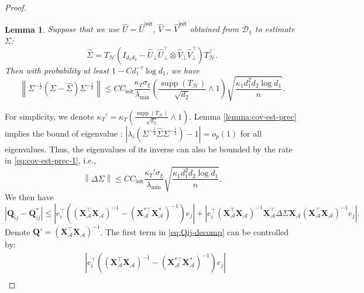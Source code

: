 \documentclass[12pt]{article}
\newcommand{\abs}[1]{\left\lvert#1\right\rvert}
\newcommand{\norm}[1]{\left\lVert#1\right\rVert}
\newcommand{\cD}{\mathcal{D}}
\def\calH{{\mathcal H}}
\newcommand{\init}{{\mathsf{init}}}
\newtheorem{Lemma}{Lemma}
\theoremstyle{plain}
\begin{document}
\begin{proof}
\begin{Lemma}
    Suppose that we use $\widehat{U}=\widehat{U}^{\init}$, $\widehat{V}=\widehat{V}^{\init}$ obtained from  $\cD_1$ to estimate $\Sigma$: 
    $$\widehat{\Sigma}= T_{\calH}(I_{d_1 d_2} - \widehat U_\perp \widehat U_\perp^\top \otimes \widehat V_\perp \widehat V_\perp^\top  ) T_{\calH}^\top. $$ 
    Then with probability at least $1-Cd_1^{-\tau}\log d_1 $, we have 
    \begin{equation}\label{eq:cov-est-prec-1}
        \norm{\Sigma^{-\frac{1}{2} }(\Sigma-\widehat{\Sigma})\Sigma^{-\frac{1}{2} } }\le CC_{\init}\frac{\kappa_T \sigma_\xi }{\lambda_{\min} }\left( \frac{\operatorname{supp}(T_{\calH} )}{\sqrt{d_2}}\wedge 1 \right)  \sqrt{\frac{ \kappa_1  d_1^2 d_2 \log d_1 }{n}}.
    \end{equation}
\end{Lemma}
For simplicity, we denote $\kappa_T' = \kappa_T\left( \frac{\operatorname{supp}(T_{\calH} )}{\sqrt{d_2}}\wedge 1 \right)  $. Lemma \ref{lemma:cov-est-prec} implies the bound of eigenvalue : $\abs{\lambda_i(\Sigma^{-\frac{1}{2} }\widehat{\Sigma} \Sigma^{-\frac{1}{2} } )-1}=o_p(1)$ for all eigenvalues. Thus, the  eigenvalues of its inverse can also be bounded by the rate in \eqref{eq:cov-est-prec-1}, i.e.,
\begin{equation*}
    \norm{\Delta \Sigma}\le CC_{\init}\frac{\kappa_T' \sigma_\xi }{\lambda_{\min} }\sqrt{\frac{ \kappa_1  d_1^2 d_2 \log d_1 }{n}}.
\end{equation*}
We then have
\begin{equation}\label{eq:Qij-decomp}
    \abs{\mathbf{Q}_{ij}- \mathbf{Q}_{ij}^*} \le \abs{e_i^\top \left( \left(\mathbf{X}_{\mathcal{A}}^{\top} \mathbf{X}_{\mathcal{A}}\right)^{-1}-\left(\mathbf{X}_{\mathcal{A}}^{*\top} \mathbf{X}_{\mathcal{A}}^*\right)^{-1}\right)e_j} + \abs{e_i^\top \left(\mathbf{X}_{\mathcal{A}}^{\top} \mathbf{X}_{\mathcal{A}}\right)^{-1}\mathbf{X}_{\mathcal{A}}^{\top} \Delta \Sigma \mathbf{X}_{\mathcal{A}}\left(\mathbf{X}_{\mathcal{A}}^{\top} \mathbf{X}_{\mathcal{A}}\right)^{-1}e_j}.
\end{equation}
Denote $\mathbf{Q}'= \left(\mathbf{X}_{\mathcal{A}}^{\top} \mathbf{X}_{\mathcal{A}}\right)^{-1} $. The first term in \eqref{eq:Qij-decomp} can be controlled by:
\begin{equation}\label{eq:}
   \begin{aligned}
      &\abs{e_i^\top \left( \left(\mathbf{X}_{\mathcal{A}}^{\top} \mathbf{X}_{\mathcal{A}}\right)^{-1}-\left(\mathbf{X}_{\mathcal{A}}^{*\top} \mathbf{X}_{\mathcal{A}}^*\right)^{-1}\right)e_j} \\

\end{aligned}
\end{equation}
\end{proof}
\end{document}
